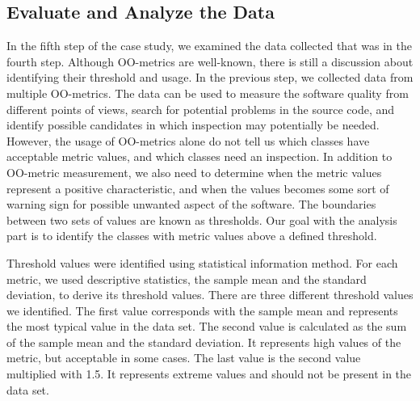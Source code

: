 \subsection{Evaluate and Analyze the Data}
In the fifth step of the case study, we examined the data collected that was in the fourth step. Although OO-metrics are well-known, there is still a discussion about identifying their threshold and usage\cite{tarcisio}. In the previous step, we collected data from multiple OO-metrics. The data can be used to measure the software quality from different points of views, search for potential problems in the source code, and identify possible candidates in which inspection may potentially be needed. However, the usage of OO-metrics alone do not tell us which classes have acceptable metric values, and which classes need an inspection. In addition to OO-metric measurement, we also need to determine when the metric values represent a positive characteristic, and when the values becomes some sort of warning sign for possible unwanted aspect of the software. The boundaries between two sets of values are known as thresholds\cite{ferreira2012identifying}. Our goal with the analysis part is to identify the classes with metric values above a defined threshold.  

Threshold values were identified using statistical information method\cite{lanza2007object}. For each metric, we used descriptive statistics, the sample mean and the standard deviation, to derive its threshold values. There are three different threshold values we identified. The first value corresponds with the sample mean and represents the most typical value in the data set. The second value is calculated as the sum of the sample mean and the standard deviation. It represents high values of the metric, but acceptable in some cases. The last value is the second value multiplied with 1.5\cite{lanza2007object}. It represents extreme values and should not be present in the data set.

